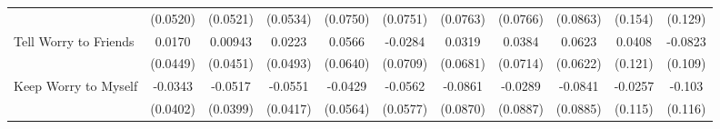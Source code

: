 {\begin{tabular}{l*{10}{c}}
            &    (0.0520)         &    (0.0521)         &    (0.0534)         &    (0.0750)         &    (0.0751)         &    (0.0763)         &    (0.0766)         &    (0.0863)         &     (0.154)         &     (0.129)         \\
\addlinespace
Tell Worry to Friends&      0.0170         &     0.00943         &      0.0223         &      0.0566         &     -0.0284         &      0.0319         &      0.0384         &      0.0623         &      0.0408         &     -0.0823         \\
            &    (0.0449)         &    (0.0451)         &    (0.0493)         &    (0.0640)         &    (0.0709)         &    (0.0681)         &    (0.0714)         &    (0.0622)         &     (0.121)         &     (0.109)         \\
\addlinespace
Keep Worry to Myself&     -0.0343         &     -0.0517         &     -0.0551         &     -0.0429         &     -0.0562         &     -0.0861         &     -0.0289         &     -0.0841         &     -0.0257         &      -0.103         \\
            &    (0.0402)         &    (0.0399)         &    (0.0417)         &    (0.0564)         &    (0.0577)         &    (0.0870)         &    (0.0887)         &    (0.0885)         &     (0.115)         &     (0.116)         \\
\bottomrule
\end{tabular}
}
